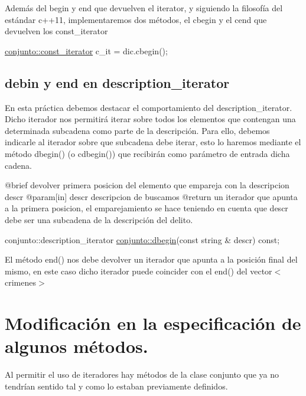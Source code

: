 Además del begin y end que devuelven el iterator, y siguiendo la filosofía del estándar c++11, implementaremos dos métodos, el cbegin y el cend que devuelven los const\-\_\-iterator


\begin{DoxyCode}
\hyperlink{classconjunto_1_1const__iterator}{conjunto::const\_iterator} c\_it = dic.cbegin();
\end{DoxyCode}
\hypertarget{index_descr}{}\subsection{debin y end en description\-\_\-iterator}\label{index_descr}
En esta práctica debemos destacar el comportamiento del description\-\_\-iterator. Dicho iterador nos permitirá iterar sobre todos los elementos que contengan una determinada subcadena como parte de la descripción. Para ello, debemos indicarle al iterador sobre que subcadena debe iterar, esto lo haremos mediante el método dbegin() (o cdbegin()) que recibirán como parámetro de entrada dicha cadena.


\begin{DoxyCode}
@brief devolver primera posicion del elemento que empareja con la descripcion descr
@param[in] descr descripcion de buscamos
@\textcolor{keywordflow}{return} un iterador que apunta a la primera posicion, el emparejamiento se hace teniendo en cuenta que 
      descr debe ser una subcadena de la descripción del delito.

conjunto::description\_iterator \hyperlink{classconjunto_ac40bafea5d9dc529c96cf0e5977100c6}{conjunto::dbegin}(\textcolor{keyword}{const} \textcolor{keywordtype}{string} & descr) \textcolor{keyword}{const};
\end{DoxyCode}


El método end() nos debe devolver un iterador que apunta a la posición final del mismo, en este caso dicho iterador puede coincider con el end() del vector$<$crimenes$>$\hypertarget{index_modif}{}\section{Modificación en la especificación de algunos métodos.}\label{index_modif}
Al permitir el uso de iteradores hay métodos de la clase conjunto que ya no tendrían sentido tal y como lo estaban previamente definidos.

